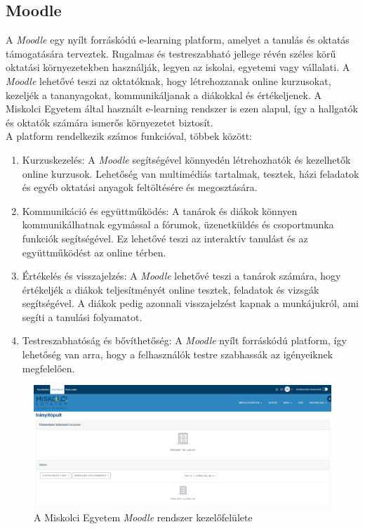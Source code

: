 \subsection{Moodle}

A \textit{Moodle} \cite{moodle} egy nyílt forráskódú e-learning platform, amelyet a tanulás és oktatás támogatására terveztek. Rugalmas és testreszabható jellege révén széles körű oktatási környezetekben használják, legyen az iskolai, egyetemi vagy vállalati. A \textit{Moodle} lehetővé teszi az oktatóknak, hogy létrehozzanak online kurzusokat, kezeljék a tananyagokat, kommunikáljanak a diákokkal és értékeljenek. A Miskolci Egyetem által használt e-learning rendszer is ezen alapul, így a hallgatók és oktatók számára ismerős környezetet biztosít.
\\
A platform rendelkezik számos funkcióval, többek között:

\begin{enumerate}


\item Kurzuskezelés: A \textit{Moodle} segítségével könnyedén létrehozhatók és kezelhetők online kurzusok. Lehetőség van multimédiás tartalmak, tesztek, házi feladatok és egyéb oktatási anyagok feltöltésére és megosztására.

\item Kommunikáció és együttműködés: A tanárok és diákok könnyen kommunikálhatnak egymással a fórumok, üzenetküldés és csoportmunka funkciók segítségével. Ez lehetővé teszi az interaktív tanulást és az együttműködést az online térben.

\item Értékelés és visszajelzés: A \textit{Moodle} lehetővé teszi a tanárok számára, hogy értékeljék a diákok teljesítményét online tesztek, feladatok és vizsgák segítségével. A diákok pedig azonnali visszajelzést kapnak a munkájukról, ami segíti a tanulási folyamatot.

\item Testreszabhatóság és bővíthetőség: A \textit{Moodle} nyílt forráskódú platform, így lehetőség van arra, hogy a felhasználók testre szabhassák az igényeiknek megfelelően.

\end{enumerate}


\begin{figure}[h]
\centering
\includegraphics[width=\textwidth]{images/moodle.png}
\caption{A Miskolci Egyetem \textit{Moodle} rendszer kezelőfelülete \cite{moodle miskolci}}
\label{fig:moodle}
\end{figure}


